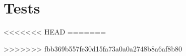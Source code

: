 \documentclass[../Head/Main.tex]{subfiles}
\begin{document}
\section{Tests}

<<<<<<< HEAD
\clearpage
=======


>>>>>>> fbb369b557fe30d15fa73a0a0a2748b8a6af8b80


\clearpage






\clearpage

\clearpage

\end{document}
